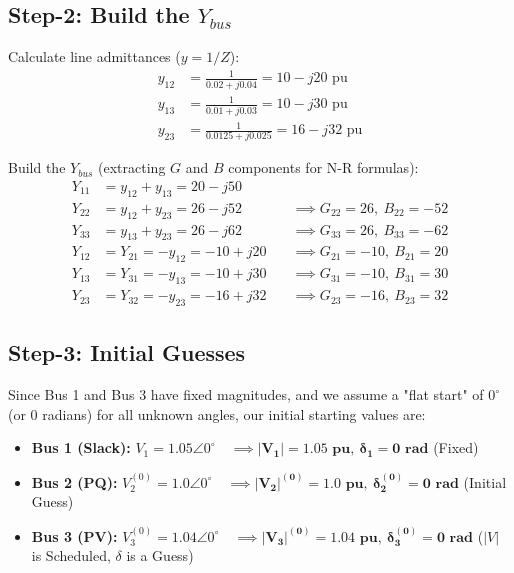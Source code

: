 \documentclass[11pt]{article}
\begin{document}
\subsection*{Step-2: Build the $Y_{bus}$}

Calculate line admittances ($y = 1/Z$):
\begin{align*}
    y_{12} &= \frac{1}{0.02 + j0.04} = 10 - j20 \text{ pu} \\
    y_{13} &= \frac{1}{0.01 + j0.03} = 10 - j30 \text{ pu} \\
    y_{23} &= \frac{1}{0.0125 + j0.025} = 16 - j32 \text{ pu}
\end{align*}

Build the $Y_{bus}$ (extracting $G$ and $B$ components for N-R formulas):
\begin{align*}
    Y_{11} &= y_{12} + y_{13} = 20 - j50 \\
    Y_{22} &= y_{12} + y_{23} = 26 - j52 \quad &\implies G_{22} = 26, \ B_{22} = -52 \\
    Y_{33} &= y_{13} + y_{23} = 26 - j62 \quad &\implies G_{33} = 26, \ B_{33} = -62 \\
    Y_{12} &= Y_{21} = -y_{12} = -10 + j20 \quad &\implies G_{21} = -10, \ B_{21} = 20 \\
    Y_{13} &= Y_{31} = -y_{13} = -10 + j30 \quad &\implies G_{31} = -10, \ B_{31} = 30 \\
    Y_{23} &= Y_{32} = -y_{23} = -16 + j32 \quad &\implies G_{23} = -16, \ B_{23} = 32
\end{align*}

\vspace{0.5cm}

\subsection*{Step-3: Initial Guesses}
\begin{stepbox}
Since Bus 1 and Bus 3 have fixed magnitudes, and we assume a "flat start" of $0^\circ$ (or $0$ radians) for all unknown angles, our initial starting values are:

\begin{itemize}
    \item \textbf{Bus 1 (Slack):} $V_1 = 1.05 \angle 0^\circ \quad \implies \mathbf{|V_1| = 1.05 \text{ pu}, \ \delta_1 = 0 \text{ rad}}$ (Fixed)
    \item \textbf{Bus 2 (PQ):} $V_2^{(0)} = 1.0 \angle 0^\circ \quad \implies \mathbf{|V_2|^{(0)} = 1.0 \text{ pu}, \ \delta_2^{(0)} = 0 \text{ rad}}$ (Initial Guess)
    \item \textbf{Bus 3 (PV):} $V_3^{(0)} = 1.04 \angle 0^\circ \quad \implies \mathbf{|V_3|^{(0)} = 1.04 \text{ pu}, \ \delta_3^{(0)} = 0 \text{ rad}}$ ($|V|$ is Scheduled, $\delta$ is a Guess)
\end{itemize}
\end{stepbox}
\end{document}

